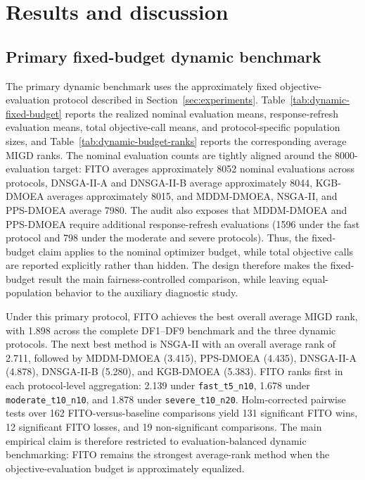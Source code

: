 \documentclass[preprint,12pt]{elsarticle}
\begin{document}
\section{Results and discussion}
\label{sec:results}


\subsection{Primary fixed-budget dynamic benchmark}
\label{subsec:primary-fixed-budget-results}



The primary dynamic benchmark uses the approximately fixed objective-evaluation protocol described in Section~\ref{sec:experiments}. Table~\ref{tab:dynamic-fixed-budget} reports the realized nominal evaluation means, response-refresh evaluation means, total objective-call means, and protocol-specific population sizes, and Table~\ref{tab:dynamic-budget-ranks} reports the corresponding average MIGD ranks. The nominal evaluation counts are tightly aligned around the 8000-evaluation target: FITO averages approximately 8052 nominal evaluations across protocols, DNSGA-II-A and DNSGA-II-B average approximately 8044, KGB-DMOEA averages approximately 8015, and MDDM-DMOEA, NSGA-II, and PPS-DMOEA average 7980. The audit also exposes that MDDM-DMOEA and PPS-DMOEA require additional response-refresh evaluations (1596 under the fast protocol and 798 under the moderate and severe protocols). Thus, the fixed-budget claim applies to the nominal optimizer budget, while total objective calls are reported explicitly rather than hidden. The design therefore makes the fixed-budget result the main fairness-controlled comparison, while leaving equal-population behavior to the auxiliary diagnostic study.

Under this primary protocol, FITO achieves the best overall average MIGD rank, with 1.898 across the complete DF1--DF9 benchmark and the three dynamic protocols. The next best method is NSGA-II with an overall average rank of 2.711, followed by MDDM-DMOEA (3.415), PPS-DMOEA (4.435), DNSGA-II-A (4.878), DNSGA-II-B (5.280), and KGB-DMOEA (5.383). FITO ranks first in each protocol-level aggregation: 2.139 under \texttt{fast\_t5\_n10}, 1.678 under \texttt{moderate\_t10\_n10}, and 1.878 under \texttt{severe\_t10\_n20}. Holm-corrected pairwise tests over 162 FITO-versus-baseline comparisons yield 131 significant FITO wins, 12 significant FITO losses, and 19 non-significant comparisons. The main empirical claim is therefore restricted to evaluation-balanced dynamic benchmarking: FITO remains the strongest average-rank method when the objective-evaluation budget is approximately equalized.
\end{document}
